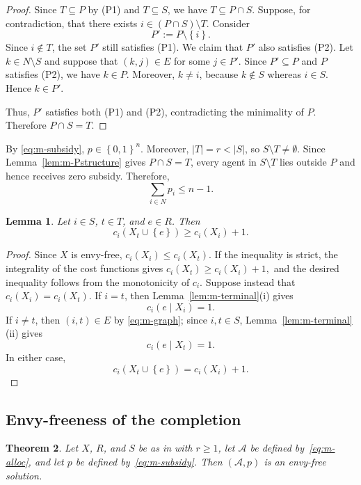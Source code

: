 \documentclass[sigconf,anonymous]{aamas}
\newcommand{\agents}{N}
\newcommand{\alloc}{\mathcal{A}}
\newcommand{\subsidy}{p}
\newcommand{\cost}{c}
\newcommand{\set}[1]{\left\{#1\right\}}
\newcommand{\abs}[1]{\left\lvert#1\right\rvert}
\theoremstyle{acmplain}
\newtheorem{theorem}{Theorem}[section]
\newtheorem{lemma}[theorem]{Lemma}
\theoremstyle{acmdefinition}
\theoremstyle{acmplain}
\begin{document}
\begin{proof}
Since $T\subseteq P$ by \textnormal{(P1)} and $T\subseteq S$, we have $T\subseteq P\cap S$. Suppose, for contradiction, that there exists $i\in (P\cap S)\setminus T$. Consider
\[
    P':=P\setminus\set{i}.
\]
Since $i\notin T$, the set $P'$ still satisfies \textnormal{(P1)}. We claim that $P'$ also satisfies \textnormal{(P2)}. Let $k\in\agents\setminus S$ and suppose that $(k,j)\in E$ for some $j\in P'$. Since $P'\subseteq P$ and $P$ satisfies \textnormal{(P2)}, we have $k\in P$. Moreover, $k\neq i$, because $k\notin S$ whereas $i\in S$. Hence $k\in P'$.

Thus, $P'$ satisfies both \textnormal{(P1)} and \textnormal{(P2)}, contradicting the minimality of $P$. Therefore $P\cap S=T$.
\end{proof}







By \eqref{eq:m-subsidy}, $\subsidy\in\set{0,1}^n$. Moreover, $\abs T=r<\abs S$, so $S\setminus T\neq\emptyset$. Since Lemma~\ref{lem:m-Pstructure} gives $P\cap S=T$, every agent in $S\setminus T$ lies outside $P$ and hence receives zero subsidy. Therefore,
\begin{equation}\label{eq_1}
  \sum_{i\in\agents}\subsidy_i\leq n-1.  
\end{equation}





\begin{lemma}
\label{lem:m-expensive}
Let $i\in S$, $t\in T$, and $e\in R$. Then
\[
    \cost_i(X_t\cup\set e)\geq \cost_i(X_i)+1.
\]
\end{lemma}

\begin{proof}
Since $X$ is envy-free, \( \cost_i(X_i)\leq \cost_i(X_t). \) If the inequality is strict, the integrality of the cost functions gives \( \cost_i(X_t)\geq \cost_i(X_i)+1, \) and the desired inequality follows from the monotonicity of $\cost_i$. Suppose instead that \(   \cost_i(X_i)=\cost_i(X_t). \) If $i=t$, then Lemma~\ref{lem:m-terminal}(i) gives
\[
    \cost_i(e\mid X_i)=1.
\]
If $i\neq t$, then $(i,t)\in E$ by \eqref{eq:m-graph}; since $i,t\in S$, Lemma~\ref{lem:m-terminal}(ii) gives
\[
    \cost_i(e\mid X_t)=1.
\] In either case,
\[
    \cost_i(X_t\cup\set e)=\cost_i(X_i)+1.
\]
\end{proof}
\subsection{Envy-freeness of the completion}
\label{sec:m-ef}
\begin{theorem}
\label{thm:m-completion}
Let $X$, $R$, and $S$ be as in  with $r\geq 1$, let $\alloc$ be defined by~\eqref{eq:m-alloc}, and let $\subsidy$ be defined by~\eqref{eq:m-subsidy}. Then $(\alloc,\subsidy)$ is an envy-free solution. \end{theorem}
\end{document}
